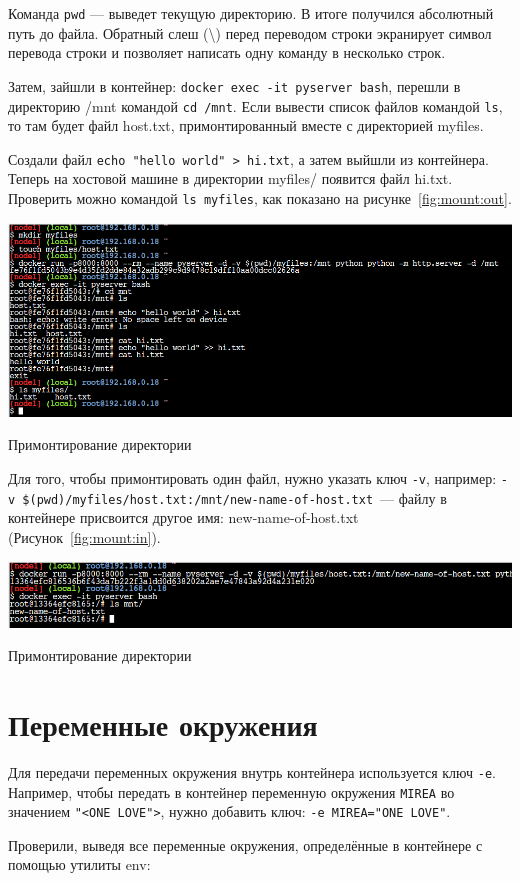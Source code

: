 Команда \texttt{pwd} --- выведет текущую директорию.
В итоге получился абсолютный путь до файла.
Обратный слеш (\textbackslash) перед переводом строки экранирует символ
перевода строки и позволяет написать одну команду в несколько строк.\par
Затем, зайшли в контейнер: \texttt{docker exec -it pyserver bash},
перешли в директорию /mnt командой \texttt{cd /mnt}.
Если вывести список файлов командой \texttt{ls}, то там будет файл host.txt,
примонтированный вместе с директорией myfiles.\par
Создали файл \verb|echo "hello world" > hi.txt|, а затем выйшли
из контейнера. Теперь на хостовой машине в директории myfiles/ появится файл
hi.txt. Проверить можно командой \texttt{ls myfiles}, как
показано на рисунке~\ref{fig:mount:out}.\par

\begin{image}
	\includegraphics[width=1\textwidth]{Screenshot from 2023-04-15 16-21-54}
	\caption{Примонтирование директории}
	\label{fig:mount:out}
\end{image}

Для того, чтобы примонтировать один файл, нужно указать ключ \texttt{-v},
например:
\verb|-v $(pwd)/myfiles/host.txt:/mnt/new-name-of-host.txt|~--- файлу
в контейнере присвоится другое имя: new-name-of-host.txt
(Рисунок~\ref{fig:mount:in}).

\begin{image}
	\includegraphics[width=1\textwidth]{Screenshot from 2023-04-15 16-24-49}
	\caption{Примонтирование директории}
	\label{fig:mount:in}
\end{image}

\section{Переменные окружения}
Для передачи переменных окружения внутрь контейнера используется ключ
\texttt{-e}. Например, чтобы передать в контейнер переменную окружения
\texttt{MIREA} во значением \texttt{"<ONE~LOVE">}, нужно добавить
ключ: \texttt{-e~MIREA="ONE~LOVE"}.\par
Проверили, выведя все переменные окружения, определённые в контейнере
с помощью утилиты env:

